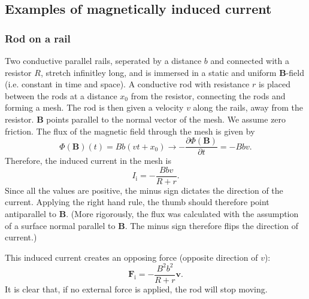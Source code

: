 \documentclass[a4paper, 12pt]{article}
\renewcommand{\vec}[1]{\mathbf{#1}}
\newcommand{\B}{\ensuremath{\vec{B}}}
\begin{document}
    \subsection{Examples of magnetically induced current}
        \subsubsection{Rod on a rail}
            Two conductive parallel rails, seperated by a distance $b$ and connected with a resistor $R$, stretch infinitley long, 
            and is immersed in a static and uniform \B-field (i.e. constant in time and space). 
            A conductive rod with resistance $r$ is placed between the rods at a distance $x_0$ from the resistor, 
            connecting the rods and forming a mesh. The rod is then given a velocity $v$ along the rails, away from the resistor.
            \B{} points parallel to the normal vector of the mesh. We assume zero friction. 
            The flux of the magnetic field through the mesh is given by
            \begin{equation}
                \Phi(\B)(t) = Bb(vt+x_0) \rightarrow -\frac{\partial \Phi(\B)}{\partial t} = -Bbv.
            \end{equation}
            Therefore, the induced current in the mesh is
            \begin{equation}
                I_\text{i} = -\frac{Bbv}{R+r}.
            \end{equation}
            Since all the values are positive, the minus sign dictates the direction of the current. Applying the right hand rule,
            the thumb should therefore point antiparallel to \B{}. 
            (More rigorously, the flux was calculated with the assumption of a surface normal parallel to \B. 
            The minus sign therefore flips the direction of current.)

            This induced current creates an opposing force (opposite direction of $v$): 
            \begin{equation}
                \vec{F}_\text{i} = -\frac{B^2b^2}{R+r}\vec{v}.
            \end{equation}
            It is clear that, if no external force is applied, the rod will stop moving.
\end{document}
